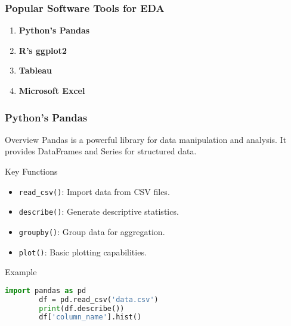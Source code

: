 \documentclass[aspectratio=169]{beamer}
\begin{document}
\begin{frame}
    \frametitle{Popular Software Tools for EDA}
    \begin{enumerate}
        \item \textbf{Python's Pandas}
        \item \textbf{R's ggplot2}
        \item \textbf{Tableau}
        \item \textbf{Microsoft Excel}
    \end{enumerate}
\end{frame}

\begin{frame}[fragile]
    \frametitle{Python's Pandas}
    \begin{block}{Overview}
        Pandas is a powerful library for data manipulation and analysis.
        It provides DataFrames and Series for structured data.
    \end{block}
    \begin{block}{Key Functions}
        \begin{itemize}
            \item \texttt{read\_csv()}: Import data from CSV files.
            \item \texttt{describe()}: Generate descriptive statistics.
            \item \texttt{groupby()}: Group data for aggregation.
            \item \texttt{plot()}: Basic plotting capabilities.
        \end{itemize}
    \end{block}
    \begin{block}{Example}
        \begin{lstlisting}[language=Python]
        import pandas as pd
        df = pd.read_csv('data.csv')
        print(df.describe())
        df['column_name'].hist()
        \end{lstlisting}
    \end{block}
\end{frame}
\end{document}
